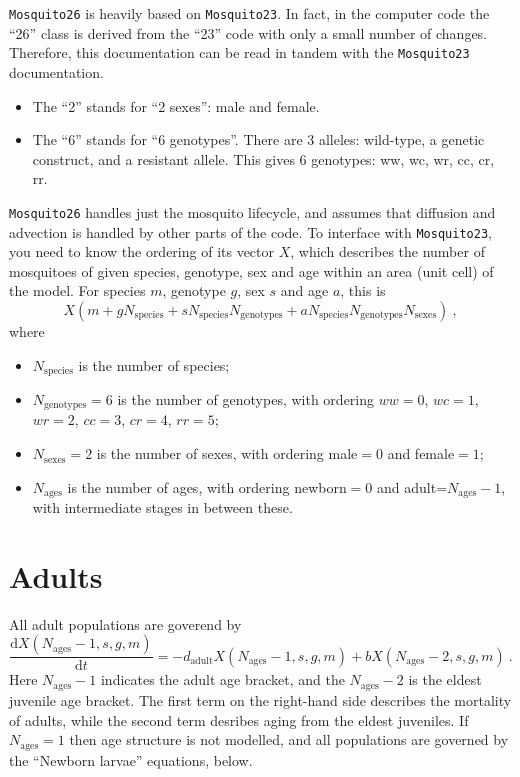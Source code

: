 \documentclass[11pt,a4paper]{article}
\begin{document}
{\tt Mosquito26} is heavily based on {\tt Mosquito23}.  In fact, in the computer code the ``26'' class is derived from the ``23'' code with only a small number of changes.  Therefore, this documentation can be read in tandem with the {\tt Mosquito23} documentation.
\begin{itemize}
\item The ``2'' stands for ``2 sexes'': male and female.
\item The ``6'' stands for ``6 genotypes''.  There are 3 alleles: wild-type, a genetic construct, and a resistant allele.  This gives 6 genotypes: ww, wc, wr, cc, cr, rr.
\end{itemize}

{\tt Mosquito26} handles just the mosquito lifecycle, and assumes that diffusion and advection is handled by other parts of the code.  To interface with {\tt Mosquito23}, you need to know the ordering of its vector $X$, which describes the number of mosquitoes of given species, genotype, sex and age within an area (unit cell) of the model.  For species $m$, genotype $g$, sex $s$ and age $a$, this is
\begin{equation}
X\left(m + gN_{\mathrm{species}} + sN_{\mathrm{species}}N_{\mathrm{genotypes}} + aN_{\mathrm{species}}N_{\mathrm{genotypes}}N_{\mathrm{sexes}} \right) \ ,
\end{equation}
where
\begin{itemize}
\item $N_{\mathrm{species}}$ is the number of species;
\item $N_{\mathrm{genotypes}} = 6$ is the number of genotypes, with ordering $ww=0$, $wc=1$, $wr=2$, $cc=3$, $cr=4$, $rr=5$;
\item $N_{\mathrm{sexes}} = 2$ is the number of sexes, with ordering male$=0$ and female$=1$;
\item $N_{\mathrm{ages}}$ is the number of ages, with ordering newborn$=0$ and adult=$N_{\mathrm{ages}}-1$, with intermediate stages in between these.
\end{itemize}

\section{Adults}

All adult populations are goverend by
\begin{equation}
\frac{\mathrm{d}X(N_{\mathrm{ages}}-1, s, g, m)}{\mathrm{d} t} = -d_{\mathrm{adult}}X(N_{\mathrm{ages}}-1, s, g, m) + b X(N_{\mathrm{ages}}-2, s, g, m) \ .
\end{equation}
Here $N_{\mathrm{ages}}-1$ indicates the adult age bracket, and the $N_{\mathrm{ages}}-2$ is the eldest juvenile age bracket.  The first term on the right-hand side describes the mortality of adults, while the second term desribes aging from the eldest juveniles.  If $N_{\mathrm{ages}}=1$ then age structure is not modelled, and all populations are governed by the ``Newborn larvae'' equations, below.
\end{document}

